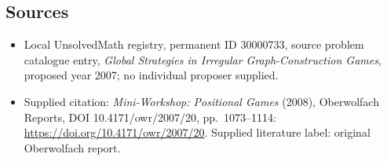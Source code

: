 \documentclass[11pt]{article}
\begin{document}
\subsection{Sources}
\begin{itemize}\item Local UnsolvedMath registry, permanent ID 30000733, source problem catalogue entry, \emph{Global Strategies in Irregular Graph-Construction Games}, proposed year 2007; no individual proposer supplied.\item Supplied citation: \emph{Mini-Workshop: Positional Games} (2008), Oberwolfach Reports, DOI 10.4171/owr/2007/20, pp.\ 1073--1114: \url{https://doi.org/10.4171/owr/2007/20}. Supplied literature label: original Oberwolfach report.\end{itemize}
\end{document}
